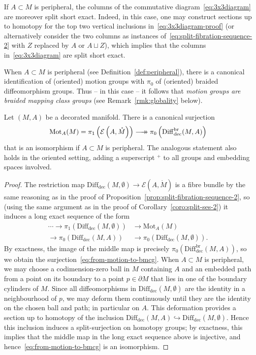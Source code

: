 \documentclass[AHL,Unicode,published]{cedram}
\newcommand{\Int}{\mathring}
\newcommand{\rgM}{\mathring{M}}
\newcommand{\Mot}{\mathrm{Mot}}
\newcommand{\rdec}{\mathrm{dec}}
\newcommand{\cE}{\mathcal{E}}
\newcommand{\longtwoheadrightarrow}{\longrightarrow\mathrel{\mkern-14mu}\rightarrow}
\newcommand{\too}{\ensuremath{\longrightarrow}}
\newcommand{\diffdec}{\ensuremath{\mathrm{Diff}_{\rdec}}}
\newcommand{\diffdecbr}{\ensuremath{\mathrm{Diff}_{\rdec}^{\mathrm{br}}}}
\begin{document}
\begin{rema}
If $A \subset M$ is peripheral, the columns of the commutative diagram~\eqref{eq:3x3diagram} are moreover split short exact. Indeed, in this case, one may construct sections up to homotopy for the top two vertical inclusions in~\eqref{eq:3x3diagram-proof} (or alternatively consider the two columns as instances of~\eqref{eq:split-fibration-sequence-2} with $Z$ replaced by $A$ or $A \sqcup Z$), which implies that the columns in~\eqref{eq:3x3diagram} are split short exact.
\end{rema}

When $A \subset M$ is peripheral (see Definition~\ref{def:peripheral}), there is a canonical identification of (oriented) motion groups with $\pi_{0}$ of (oriented) braided diffeomorphism groups. Thus -- in this case -- it follows that \emph{motion groups are braided mapping class groups} (see Remark~\ref{rmk:globality} below).

\begin{prop}\label{prop:braided-diff-groups}
Let $(M,A)$ be a decorated manifold. There is a canonical surjection
\begin{equation}\label{eq:from-motion-to-bmcg}
\Mot_{A}(M) = \pi_{1}\left(\cE\left(A,\Int{M}\right)\right) \longtwoheadrightarrow \pi_{0}\left(\diffdecbr(M,A)\right)
\end{equation}
that is an isomorphism if $A \subset M$ is peripheral. The analogous statement also holds in the oriented setting, adding a superscript ${}^{+}$ to all groups and embedding spaces involved.
\end{prop}

\begin{proof}
The restriction map $\diffdec(M,\emptyset) \to \cE(A,\rgM)$ is a fibre bundle by the same reasoning as in the proof of Proposition~\ref{prop:split-fibration-sequence-2}, so (using the same argument as in the proof of Corollary~\ref{coro:split-ses-2}) it induces a long exact sequence of the form
\begin{align*}
\cdots \to \pi_{1}\left(\diffdec(M,\emptyset)\right) &\too \Mot_{A}(M)\\ 
\too \pi_{0}\left(\diffdec(M,A)\right)
&\too \pi_{0}\left(\diffdec(M,\emptyset)\right).
\end{align*}
By exactness, the image of the middle map is precisely $\pi_{0}(\diffdecbr(M,A))$, so we obtain the surjection~\eqref{eq:from-motion-to-bmcg}. When $A \subset M$ is peripheral, we may choose a codimension-zero ball in $M$ containing $A$ and an embedded path from a point on its boundary to a point $p \in \partial M$ that lies in one of the boundary cylinders of $M$. Since all diffeomorphisms in $\diffdec(M,\emptyset)$ are the identity in a neighbourhood of $p$, we may deform them continuously until they are the identity on the chosen ball and path; in particular on $A$. This deformation provides a section up to homotopy of the inclusion $\diffdec(M,A) \hookrightarrow \diffdec(M,\emptyset)$. Hence this inclusion induces a split-surjection on homotopy groups; by exactness, this implies that the middle map in the long exact sequence above is injective, and hence~\eqref{eq:from-motion-to-bmcg} is an isomorphism.
\end{proof}
\end{document}
